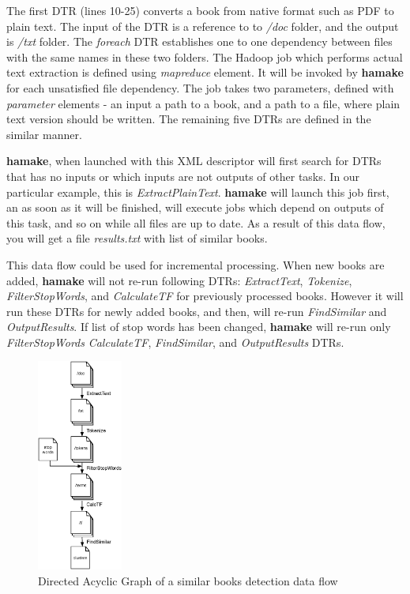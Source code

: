 \documentclass[10pt,conference,letterpaper]{IEEEtran}
\begin{document}


The first DTR (lines 10-25) converts a book from native format such as
PDF to plain text. The input of the DTR is a reference to to
\emph{/doc} folder, and the output is \emph{/txt} folder. The
\emph{foreach} DTR establishes one to one dependency between files
with the same names in these two folders. The Hadoop job which
performs actual text extraction is defined using \emph{mapreduce}
element. It will be invoked by \textbf{hamake} for each unsatisfied
file dependency. The job takes two parameters, defined with
\emph{parameter} elements - an input a path to a book, and a path to a
file, where plain text version should be written. The remaining five
DTRs are defined in the similar manner.

\textbf{hamake}, when launched with this XML descriptor will first
search for DTRs that has no inputs or which inputs are not outputs of
other tasks. In our particular example, this is
\emph{ExtractPlainText}. \textbf{hamake} will launch this job first,
an as soon as it will be finished, will execute jobs which depend on
outputs of this task, and so on while all files are up to date. As a
result of this data flow, you will get a file \emph{results.txt} with
list of similar books.

This data flow could be used for incremental processing. When new
books are added, \textbf{hamake} will not re-run following DTRs:
\emph{ExtractText}, \emph{Tokenize}, \emph{FilterStopWords}, and
\emph{CalculateTF} for previously processed books. However it will run
these DTRs for newly added books, and then, will re-run
\emph{FindSimilar} and \emph{OutputResults}.  If list of stop words
has been changed, \textbf{hamake} will re-run only
\emph{FilterStopWords} \emph{CalculateTF}, \emph{FindSimilar}, and
\emph{OutputResults} DTRs.

\begin{figure}[htp]
\centering
\includegraphics[width=0.25\textwidth]{SimilarityAlgDAG.eps}
\caption{Directed Acyclic Graph of a similar books detection data flow}
\label{fig:SimilarityAlgDAG}
\end{figure}
\end{document}
